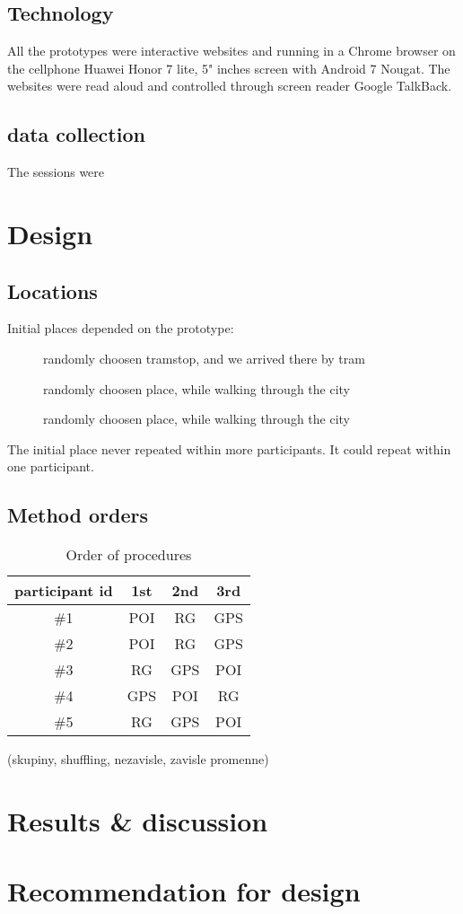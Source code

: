 	\subsection{Technology}
	All the prototypes were interactive websites and running in a Chrome browser on the cellphone Huawei Honor 7 lite, 5" inches screen with Android 7 Nougat. The websites were read aloud and controlled through screen reader Google TalkBack\cite{later}.
	\subsection{data collection}
	The sessions were
	
	\section{Design}
	\subsection{Locations}
	Initial places depended on the prototype:
	\begin{description}
		\item [\poi{}] randomly choosen tramstop, and we arrived there by tram
		\item [\reversegeo{}] randomly choosen place, while walking through the city
		\item [\gps{}] randomly choosen place, while walking through the city
	\end{description}
	
	The initial place never repeated within more participants. It could repeat within one participant.
	\subsection{Method orders}
	\begin{table}[]
		\centering
		\caption{Order of procedures}
		\label{my-label}
		\begin{tabular}{@{}cccc@{}}
			\toprule
			\textbf{participant id} & \textbf{1st} & \textbf{2nd} & \textbf{3rd} \\ \midrule
			\#1                     & POI          & RG           & GPS          \\
			\#2                     & POI          & RG           & GPS          \\
			\#3                     & RG           & GPS          & POI          \\
			\#4                     & GPS          & POI          & RG           \\
			\#5                     & RG           & GPS          & POI          \\ \bottomrule
		\end{tabular}
	\end{table}
	
	(skupiny, shuffling, nezavisle, zavisle promenne)
	\section{Results \& discussion}
	\section{Recommendation for design}